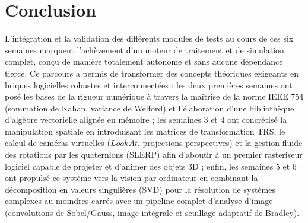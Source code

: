 \documentclass[12pt,a4paper]{report}
\begin{document}

\chapter*{Conclusion}

L'intégration et la validation des différents modules de tests au cours de ces six semaines marquent l'achèvement d'un moteur de traitement et de simulation complet, conçu de manière totalement autonome et sans aucune dépendance tierce. Ce parcours a permis de transformer des concepts théoriques exigeants en briques logicielles robustes et interconnectées : les deux premières semaines ont posé les bases de la rigueur numérique à travers la maîtrise de la norme IEEE 754 (sommation de Kahan, variance de Welford) et l'élaboration d'une bibliothèque d'algèbre vectorielle alignée en mémoire ; les semaines 3 et 4 ont concrétisé la manipulation spatiale en introduisant les matrices de transformation TRS, le calcul de caméras virtuelles ($LookAt$, projections perspectives) et la gestion fluide des rotations par les quaternions (SLERP) afin d'aboutir à un premier rasteriseur logiciel capable de projeter et d'animer des objets 3D ; enfin, les semaines 5 et 6 ont propulsé ce système vers la vision par ordinateur en combinant la décomposition en valeurs singulières (SVD) pour la résolution de systèmes complexes au moindres carrés avec un pipeline complet d'analyse d'image (convolutions de Sobel/Gauss, image intégrale et seuillage adaptatif de Bradley).
\end{document}
